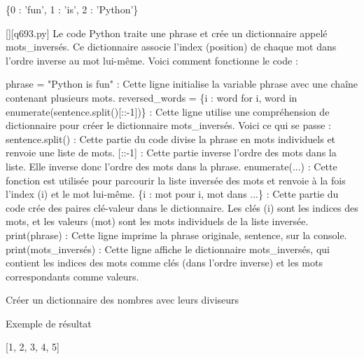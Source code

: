 \{0 : 'fun', 1 : 'is', 2 : 'Python'\}
        \par
        \begin{solution}
            \renewcommand{\nomfichier}{q693.py}
            \pythonfile{\chemincode \nomfichier}[][\nomfichier]
            Le code Python traite une phrase et crée un dictionnaire appelé mots\_inversés. Ce dictionnaire associe l'index (position) de chaque mot dans l'ordre inverse au mot lui-même. Voici comment fonctionne le code :

    phrase = "Python is fun" : Cette ligne initialise la variable phrase avec une chaîne contenant plusieurs mots.
    reversed\_words = \{i : word for i, word in enumerate(sentence.split()[::-1])\} : Cette ligne utilise une compréhension de dictionnaire pour créer le dictionnaire mots\_inversés. Voici ce qui se passe :
        sentence.split() : Cette partie du code divise la phrase en mots individuels et renvoie une liste de mots.
        [::-1] : Cette partie inverse l'ordre des mots dans la liste. Elle inverse donc l'ordre des mots dans la phrase.
        enumerate(...) : Cette fonction est utilisée pour parcourir la liste inversée des mots et renvoie à la fois l'index (i) et le mot lui-même.
        \{i : mot pour i, mot dans ...\} : Cette partie du code crée des paires clé-valeur dans le dictionnaire. Les clés (i) sont les indices des mots, et les valeurs (mot) sont les mots individuels de la liste inversée.
    print(phrase) : Cette ligne imprime la phrase originale, sentence, sur la console.
    print(mots\_inversés) : Cette ligne affiche le dictionnaire mots\_inversés, qui contient les indices des mots comme clés (dans l'ordre inverse) et les mots correspondants comme valeurs.
        \end{solution}
        

        \question
        Créer un dictionnaire des nombres avec leurs diviseurs

Exemple de résultat

[1, 2, 3, 4, 5]

